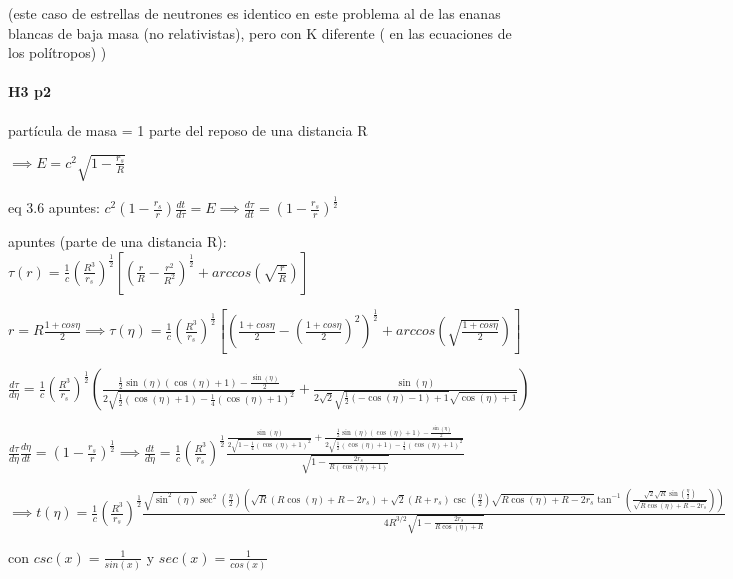 \documentclass[12pt]{book}
\begin{document}
(este caso de estrellas de neutrones es identico en este problema al de las enanas blancas de baja masa (no relativistas), pero con K diferente ( en las ecuaciones de los polítropos) )

\paragraph{H3 p2}

partícula de masa = 1 parte del  reposo de una distancia R 

$\implies E = c^2 \sqrt{1-\frac{r_s}{R}}$ 

eq 3.6 apuntes: $ c^2(1-\frac{r_s}{r}) \frac{dt}{d\tau} = E \implies \frac{d\tau}{dt} = (1-\frac{r_s}{r})^{\frac{1}{2}}  $

apuntes (parte de una distancia R): $\tau(r) = \frac{1}{c} (\frac{R^3}{r_s})^{\frac{1}{2}} [(\frac{r}{R} -\frac{r^2}{R^2})^{\frac{1}{2}} + arccos(\sqrt{\frac{r}{R}}) ] $

$r = R \frac{1+cos \eta}{2} \implies \tau(\eta) = \frac{1}{c} (\frac{R^3}{r_s})^{\frac{1}{2}} [(\frac{1+cos \eta}{2} -(\frac{1+cos \eta}{2}) ^2)^{\frac{1}{2}} + arccos(\sqrt{\frac{1+cos \eta}{2}}) ] $

$\frac{d\tau}{d\eta} =  \frac{1}{c} (\frac{R^3}{r_s})^{\frac{1}{2}} ( \frac{\frac{1}{2} \sin (\eta) (\cos (\eta)+1)-\frac{\sin (\eta)}{2}}{2 \sqrt{\frac{1}{2} (\cos (\eta)+1)-\frac{1}{4} (\cos (\eta)+1)^2}} + \frac{\sin (\eta)}{2 \sqrt{2} \sqrt{\frac{1}{2} (-\cos (\eta)-1)+1} \sqrt{\cos (\eta)+1}} )$





$\frac{d\tau}{d\eta} \frac{d\eta}{dt} = (1-\frac{r_s}{r})^{\frac{1}{2}} \implies \frac{dt}{d\eta} = \frac{1}{c} (\frac{R^3}{r_s})^{\frac{1}{2}} 
\frac{\frac{\sin (\eta)}{2 \sqrt{1-\frac{1}{4} (\cos (\eta)+1)^2}}+\frac{\frac{1}{2} \sin (\eta) (\cos (\eta)+1)-\frac{\sin (\eta)}{2}}{2 \sqrt{\frac{1}{2} (\cos (\eta)+1)-\frac{1}{4} (\cos (\eta)+1)^2}}}{\sqrt{1-\frac{2 r_s}{R (\cos (\eta)+1)}}}
$

$\implies t(\eta) = \frac{1}{c} (\frac{R^3}{r_s})^{\frac{1}{2}} 
\frac{\sqrt{\sin ^2(\eta)} \sec ^2\left(\frac{\eta}{2}\right) \left(\sqrt{R} (R \cos (\eta)+R-2 r_s)+\sqrt{2} (R+r_s) \csc \left(\frac{\eta}{2}\right) \sqrt{R \cos (\eta)+R-2 r_s} \tan ^{-1}\left(\frac{\sqrt{2} \sqrt{R} \sin \left(\frac{\eta}{2}\right)}{\sqrt{R \cos (\eta)+R-2 r_s}}\right)\right)}{4 R^{3/2} \sqrt{1-\frac{2 r_s}{R \cos (\eta)+R}}} $

con $csc(x) = \frac{1}{sin(x)}$ y $sec(x) = \frac{1}{cos(x)}$
\end{document}
